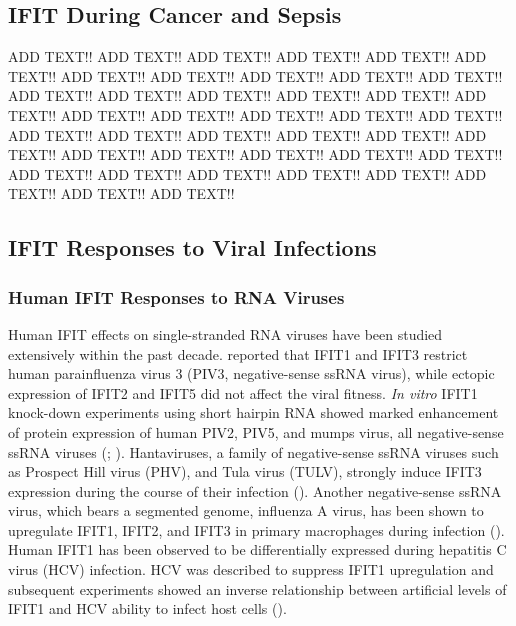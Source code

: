 \subsection{IFIT During Cancer and Sepsis} \label{subsec:IFIT During Cancer and Sepsis}
ADD TEXT!! ADD TEXT!! ADD TEXT!! ADD TEXT!! ADD TEXT!! ADD TEXT!! ADD TEXT!! ADD TEXT!! ADD TEXT!! ADD TEXT!! ADD TEXT!! ADD TEXT!! ADD TEXT!! ADD TEXT!! ADD TEXT!! ADD TEXT!! ADD TEXT!! ADD TEXT!! ADD TEXT!! ADD TEXT!! ADD TEXT!! ADD TEXT!! ADD TEXT!! ADD TEXT!! ADD TEXT!! ADD TEXT!! ADD TEXT!! ADD TEXT!! ADD TEXT!! ADD TEXT!! ADD TEXT!! ADD TEXT!! ADD TEXT!! ADD TEXT!! ADD TEXT!! ADD TEXT!! ADD TEXT!! ADD TEXT!! ADD TEXT!! ADD TEXT!! ADD TEXT!! 




\subsection{IFIT Responses to Viral Infections} \label{subsec:IFIT Responses to Viral Infections}
\subsubsection{Human IFIT Responses to RNA Viruses} \label{Human IFIT Responses to RNA Viruses}
Human IFIT effects on single-stranded RNA viruses have been studied extensively within the past decade. \cite{Rabbani2016Identification3} reported that IFIT1 and IFIT3 restrict human parainfluenza virus 3 (PIV3, negative-sense ssRNA virus), while ectopic expression of IFIT2 and IFIT5 did not affect the viral fitness. \textit{In vitro} IFIT1 knock-down experiments using short hairpin RNA showed marked enhancement of protein expression of human PIV2, PIV5, and mumps virus, all negative-sense ssRNA viruses (\cite{Andrejeva2013ISG56/IFIT1Synthesis}; \cite{Young2016HumanFamily}). Hantaviruses, a family of negative-sense ssRNA viruses such as Prospect Hill virus (PHV), and Tula virus (TULV), strongly induce IFIT3 expression during the course of their infection (\cite{Matthys2011TheInduction}). Another negative-sense ssRNA virus, which bears a segmented genome, influenza A virus, has been shown to upregulate IFIT1, IFIT2, and IFIT3 in primary macrophages during infection (\cite{Lietzen2011QuantitativeMacrophages}). Human IFIT1 has been observed to be differentially expressed during hepatitis C virus (HCV) infection. HCV was described to suppress IFIT1 upregulation and subsequent experiments showed an inverse relationship between artificial levels of IFIT1 and HCV ability to infect host cells (\cite{Raychoudhuri2011ISG56Replication}).




